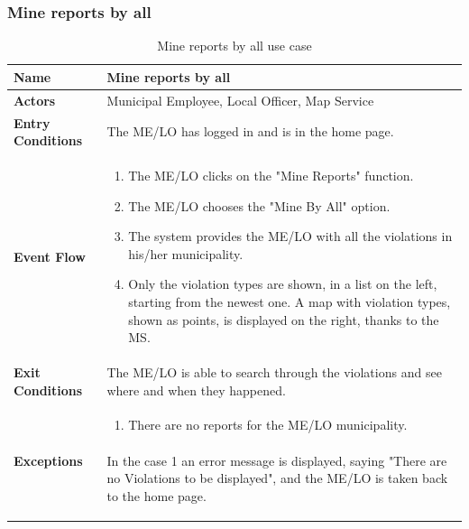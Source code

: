 					\subsubsection{Mine reports by all}
					\begin{table}[!h]
						\centering
						\vspace{-2mm}
						\begin{tabular}{lp{}}
							\toprule
							\textbf{Name} & \textbf{Mine reports by all} \\[1mm]
							\midrule
							\textbf{Actors} & Municipal Employee, Local Officer, Map Service \\[1mm]
							\textbf{Entry Conditions} & The ME/LO has logged in and is in the home page. \vspace{1mm}\\
							\textbf{Event Flow} &
							\vspace{-5mm} 
							\begin{enumerate}
								\setlength\itemsep{0.2mm}
								\item The ME/LO clicks on the "Mine Reports" function.
								\item The ME/LO chooses the "Mine By All" option.
								\item The system provides the ME/LO with all the violations in his/her municipality.
								\item Only the violation types are shown, in a list on the left, starting from the newest one. A map with violation types, shown as points, is displayed on the right, thanks to the MS.
							\end{enumerate} \\
							\textbf{Exit Conditions} & The ME/LO is able to search through the violations and see where and when they happened. \vspace{1mm}\\
							\textbf{Exceptions} & 
								\vspace{-5mm} 
								\begin{enumerate}
									\item There are no reports for the ME/LO municipality.
								\end{enumerate}
								\vspace{-7mm}
								\paragraph{}
									In the case 1 an error message is displayed, saying "There are no Violations to be displayed", and the ME/LO is taken back to the home page. \\
							\bottomrule
						\end{tabular}
						\caption{Mine reports by all use case}
					\end{table}
					\clearpage
